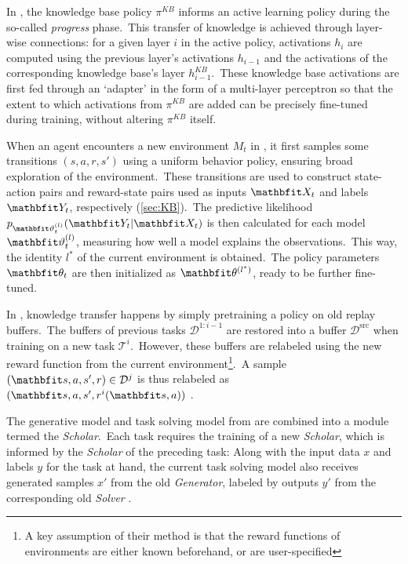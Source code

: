 In \textcite{Schwarz2018}, the knowledge base policy $\pi^{KB}$ informs an active learning policy during the so-called \emph{progress} phase.\ This transfer of knowledge is achieved through layer-wise connections: for a given layer $i$ in the active policy, activations $h_i$ are computed using the previous layer's activations $h_{i-1}$ and the activations of the corresponding knowledge base's layer $h^{KB}_{i-1}$.\ These knowledge base activations are first fed through an `adapter' in the form of a multi-layer perceptron so that the extent to which activations from $\pi^{KB}$ are added can be precisely fine-tuned during training, without altering $\pi^{KB}$ itself.

When an agent encounters a new environment $M_t$ in \textcite{Wang2022}, it first samples some transitions $(s, a, r, s')$ using a uniform behavior policy, ensuring broad exploration of the environment.\ These transitions are used to construct state-action pairs and reward-state pairs used as inputs $\bvec{X}_t$ and labels $\bvec{Y}_t$, respectively (\cref{sec:KB}).\ The predictive likelihood $p_{\bvec{\vartheta}^{(l)}_t}(\bvec{Y}_t|\bvec{X}_t)$ is then calculated for each model $\bvec{\vartheta}^{(l)}_t$, measuring how well a model explains the observations.\ This way, the identity $l^*$ of the current environment is obtained.\ The policy parameters $\bvec{\theta}_t$ are then initialized as $\bvec{\theta}^{(l^*)}$, ready to be further fine-tuned.

In \textcite{Xie2021}, knowledge transfer happens by simply pretraining a policy on old replay buffers.\ The buffers of previous tasks $\mathcal{D}^{1:i-1}$ are restored into a buffer $\mathcal{D}^{\mathrm{src}}$ when training on a new task $\mathcal{T}^{i}$.\ However, these buffers are relabeled using the new reward function from the current environment\footnote{A key assumption of their method is that the reward functions of environments are either known beforehand, or are user-specified}.\ A sample $(\bvec{s, a, s'}, r)\in \mathcal{D}^j$ is thus relabeled as $(\bvec{s, a, s'}, r^i(\bvec{s, a}))$ .\

The generative model and task solving model from \textcite{Shin2017} are combined into a module termed the \emph{Scholar}.\ Each task requires the training of a new \emph{Scholar}, which is informed by the \emph{Scholar} of the preceding task: Along with the input data $x$ and labels $y$ for the task at hand, the current task solving model also receives generated samples $x'$ from the old \emph{Generator}, labeled by outputs $y'$ from the corresponding old \emph{Solver} .


